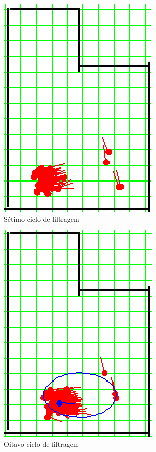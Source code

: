 \begin{figure}[H]
  \centering
  \includegraphics[scale=1]{figuras/cen1_ex1/8.eps}
  \caption[Sétimo Ciclo de Filtragem]{Sétimo ciclo de filtragem}
  \label{img:cen1_ex1_8}
\end{figure}

\begin{figure}[H]
  \centering
  \includegraphics[scale=1]{figuras/cen1_ex1/9.eps}
  \caption[Oitavo Ciclo de Filtragem]{Oitavo ciclo de filtragem}
  \label{img:cen1_ex1_9}
\end{figure}

